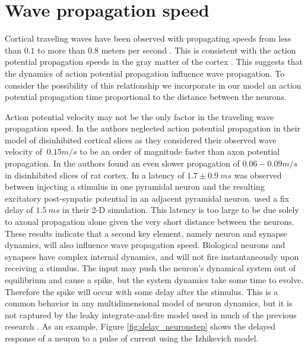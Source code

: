 \section{Wave propagation speed} \label{sub:propagation_speed}
Cortical traveling waves have been observed with propagating speeds from less than $0.1$ to more than $0.8$ meters per second \citet{Sato2012}\citet{Golomb1997}\citet{Chervin1988}.
This is consistent with the action potential propagation speeds in the gray matter of the cortex \citet{Muller2018}. 
This suggests that the dynamics of action potential propagation influence wave propagation. 
To consider the possibility of this relationship we incorporate in our model an action potential propagation time proportional to the distance between the neurons.

Action potential velocity may not be the only factor in the traveling wave propagation speed.
In \citet{Golomb1997} the authors neglected action potential propagation in their model of disinhibited cortical slices as they considered their observed wave velocity of $~0.15 m/s$ to be an order of magnitude faster than axon potential propagation.
In \citet{Chervin1988} the authors found an even slower propagation of $0.06-0.09 m/s$ in disinhibited slices of rat cortex.
In  \citet{Markram1997} a latency of $1.7\pm 0.9\ ms$ was observed between injecting a stimulus in one pyramidal neuron and the resulting excitatory post-synpatic potential in an adjacent pyramidal neuron.
\citet{Mehring2003} used a fix delay of $1.5~ms$ in their 2-D simulation.
This latency is too large to be due solely to axonal propagation alone given the very short distance between the neurons. 
These results indicate that a second key element, namely neuron and synapse dynamics, will also influence wave propagation speed.
Biological neurons and synapses  have complex internal dynamics, and will not fire instantaneously upon receiving a stimulus.
The input may push the neuron's dynamical system out of equilibrium and cause a spike, but the system dynamics take some time to evolve.
Therefore the spike will occur with some delay after the stimulus.
This is a common behavior in any multidimensional model of neuron dynamics, but it is not captured by the leaky integrate-and-fire model used in much of the previous research \citet{keane2015}\citet{Senk2020}.
As an example, Figure \ref{fig:delay_neuronstep} shows the delayed response of a neuron to a pulse of current using the Izhikevich model.
